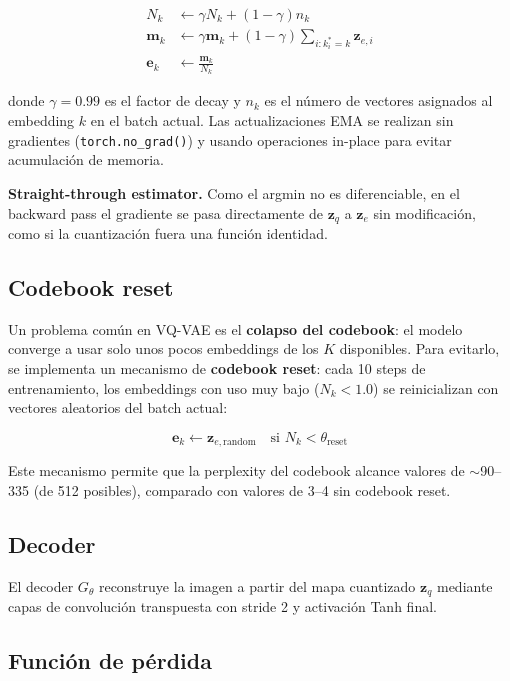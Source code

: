 \begin{align}
N_k &\leftarrow \gamma N_k + (1-\gamma) n_k \\
\mathbf{m}_k &\leftarrow \gamma \mathbf{m}_k + (1-\gamma) \sum_{i: k^*_i = k} \mathbf{z}_{e,i} \\
\mathbf{e}_k &\leftarrow \frac{\mathbf{m}_k}{N_k}
\end{align}

donde $\gamma = 0.99$ es el factor de decay y $n_k$ es el número de vectores asignados al embedding $k$ en el batch actual. Las actualizaciones EMA se realizan sin gradientes (\texttt{torch.no\_grad()}) y usando operaciones in-place para evitar acumulación de memoria.

\textbf{Straight-through estimator.} Como el argmin no es diferenciable, en el backward pass el gradiente se pasa directamente de $\mathbf{z}_q$ a $\mathbf{z}_e$ sin modificación, como si la cuantización fuera una función identidad.

\subsection{Codebook reset}

Un problema común en VQ-VAE es el \textbf{colapso del codebook}: el modelo converge a usar solo unos pocos embeddings de los $K$ disponibles. Para evitarlo, se implementa un mecanismo de \textbf{codebook reset}: cada 10 steps de entrenamiento, los embeddings con uso muy bajo ($N_k < 1.0$) se reinicializan con vectores aleatorios del batch actual:

\begin{equation}
\mathbf{e}_k \leftarrow \mathbf{z}_{e,\text{random}} \quad \text{si } N_k < \theta_{\text{reset}}
\end{equation}

Este mecanismo permite que la perplexity del codebook alcance valores de $\sim$90--335 (de 512 posibles), comparado con valores de 3--4 sin codebook reset.

\subsection{Decoder}

El decoder $G_\theta$ reconstruye la imagen a partir del mapa cuantizado $\mathbf{z}_q$ mediante capas de convolución transpuesta con stride 2 y activación Tanh final.

\subsection{Función de pérdida}

